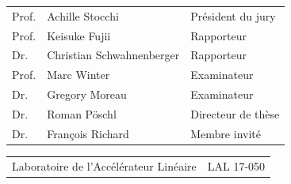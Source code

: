 \documentclass[12pt]{article}
\begin{document}
{\vspace{0.5cm}

\vspace{1cm}
\hspace{-1cm}{  Composition de jury: \par}
}
\begin{table}[H]
	\begin{tabular}{l l l }
		Prof.& Achille Stocchi & Pr\'esident du jury\\
		Prof.& Keisuke Fujii  &Rapporteur \\
		Dr.& Christian Schwahnenberger  &Rapporteur\\
		Prof.& Marc Winter &Examinateur\\
		Dr.& Gregory Moreau &Examinateur\\
		Dr.& Roman P\"oschl &Directeur de th\`{e}se\\
		Dr.& Fran\c cois Richard &Membre invit\'{e} \\
		
	\end{tabular}
\end{table}

\vspace{0.3cm}

\begin{table}[H]
	\begin{tabular}{c r}
\hline
Laboratoire de l'Acc\'el\'erateur Lin\'eaire \hspace{4cm} &LAL 17-050
	\end{tabular}
\end{table}
\end{document}
